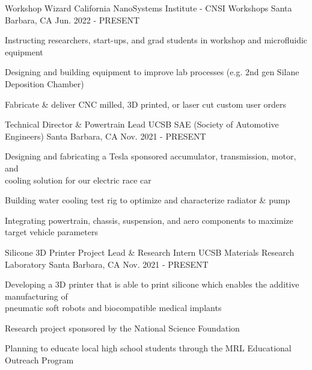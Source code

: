 

\begin{cventries}

\cventry
{Workshop Wizard} %
{California NanoSystems Institute - CNSI Workshops} %
{Santa Barbara, CA} %
{Jun. 2022 - PRESENT} %
{ %
\begin{cvitems}
\item {Instructing researchers, start-ups, and grad students in workshop and microfluidic equipment}
\item {Designing and building equipment to improve lab processes (e.g. 2nd gen Silane Deposition Chamber)}
\item {Fabricate \& deliver CNC milled, 3D printed, or laser cut custom user orders }
\end{cvitems}
}


\cventry
{Technical Director \& Powertrain Lead} %
{UCSB SAE (Society of Automotive Engineers)} %
{Santa Barbara, CA} %
{Nov. 2021 - PRESENT} %
{ %
\begin{cvitems}   
\item {Designing and fabricating a Tesla sponsored accumulator, transmission, motor, and \\ cooling solution for our electric race car}
\item {Building water cooling test rig to optimize and characterize radiator \& pump}
\item {Integrating powertrain, chassis, suspension, and aero components to maximize target vehicle parameters}
\end{cvitems}
}



\cventry
{Silicone 3D Printer Project Lead \& Research Intern} %
{UCSB Materials Research Laboratory} %
{Santa Barbara, CA} %
{Nov. 2021 - PRESENT} %
{ %
\begin{cvitems}
\item {Developing a 3D printer that is able to print silicone which enables the additive manufacturing of \\ pneumatic soft robots and biocompatible medical implants}
\item {Research project sponsored by the National Science Foundation}
\item {Planning to educate local high school students through the MRL Educational Outreach Program}
\end{cvitems}
}


\end{cventries}

